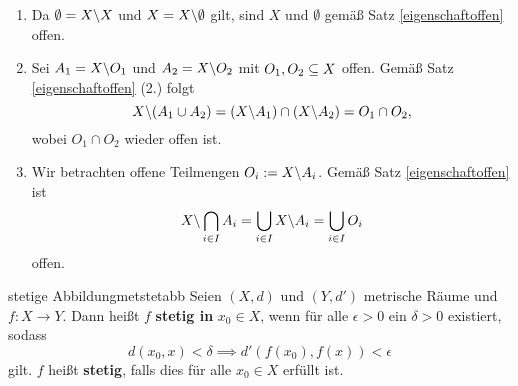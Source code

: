 \begin{beweis}
\begin{enumerate}
\item Da $\emptyset = X \backslash X$ und $X = X \backslash \emptyset$ gilt, sind $X$ und $\emptyset$ gemäß Satz \ref{eigenschaftoffen} offen.
\item Sei $A_1 = X \backslash O_1$ und $A_2 = X \backslash O_2$ mit $O_1, O_2 \subseteq X$ offen. Gemäß Satz \ref{eigenschaftoffen} (2.) folgt 
\begin{equation}
X \backslash (A_1 \cup A_2) = (X \backslash A_1) \cap (X \backslash A_2) = O_1 \cap O_2,
\end{equation}
wobei $O_1 \cap O_2$ wieder offen ist.
\item Wir betrachten offene Teilmengen $O_i := X \backslash A_i$. Gemäß Satz \ref{eigenschaftoffen} ist 
\begin{equation}
X \backslash \bigcap_{i\in I} A_i = \bigcup_{i \in I} X \backslash A_i = \bigcup_{i \in I} O_i 
\end{equation}
offen.
\end{enumerate}
\end{beweis}
\begin{definition}{stetige Abbildung}{metstetabb}
Seien $(X,d)$ und $(Y,d')$ metrische Räume und $f: X \to Y$. Dann heißt $f$ \textbf{stetig in} $x_0 \in X$, wenn für alle $\epsilon > 0$ ein $\delta > 0$ existiert, sodass 
\begin{equation}
d(x_0,x) < \delta \implies d'(f(x_0), f(x)) < \epsilon
\end{equation}
gilt. $f$ heißt \textbf{stetig}, falls dies für alle $x_0 \in X$ erfüllt ist.
\end{definition}


